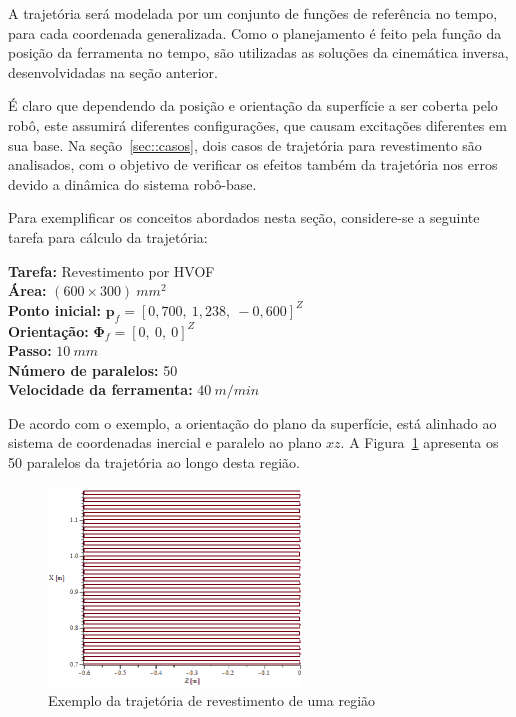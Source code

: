 A trajetória será modelada por um conjunto de funções de referência no tempo,
para cada coordenada generalizada. Como o planejamento é feito pela função da
posição da ferramenta no tempo, são utilizadas as soluções da cinemática
inversa, desenvolvidadas na seção anterior.

É claro que dependendo da posição e orientação da superfície a ser coberta pelo
robô, este assumirá diferentes configurações, que causam excitações diferentes
em sua base. Na seção~\ref{sec::casos}, dois casos de trajetória para
revestimento são analisados, com o objetivo de verificar os efeitos também da
trajetória nos erros devido a dinâmica do sistema robô-base. 

Para exemplificar os conceitos abordados nesta seção, considere-se a seguinte
tarefa para cálculo da trajetória:
%
\newline
\begin{tcolorbox}
[colframe=black!75!white, colback=white, title = Trajetória -- Exemplo] 
  \textbf{Tarefa:} Revestimento por HVOF \\
  \textbf{Área:} $(600 \times 300)~mm^2$ \\
  \textbf{Ponto inicial:} $\mathbf{p}_f = [0,700,~1,238,~-0,600]^Z$ \\
  \textbf{Orientação:} $\boldsymbol{\Phi}_{f} = [0,~0,~0]^Z$ \\
  \textbf{Passo:} $10~mm$ \\
  \textbf{Número de paralelos:} 50 \\
  \textbf{Velocidade da ferramenta:} $40~m/min$
\end{tcolorbox}
%
De acordo com o exemplo, a orientação do plano da superfície,
está alinhado ao sistema de coordenadas inercial e paralelo ao plano $xz$. A
Figura~\ref{fig::trajec_600x500x10} apresenta os 50 paralelos da trajetória ao
longo desta região.

\begin{figure}[h]
	\centering 
 	\includegraphics[width=0.60\textwidth]{figs/trajec_600x500x10}
 	\caption{Exemplo da trajetória de revestimento de uma região}
 	\label{fig::trajec_600x500x10}
\end{figure}

